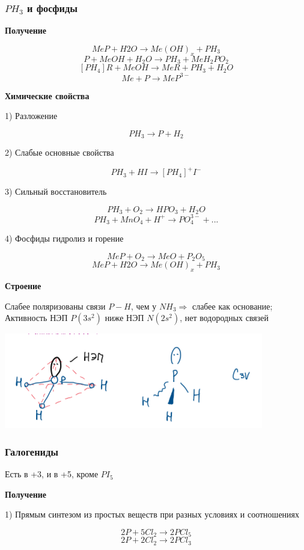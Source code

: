 \documentclass[14pt,a4paper]{scrartcl}
\begin{document}
\subsubsection{$PH_3$ и фосфиды}

\textbf{Получение}

$$MeP + H2O \rightarrow Me(OH)_x + PH_3$$
$$P + MeOH + H_2O \rightarrow PH_3 + MeH_2PO_2$$
$$[PH_4]R + MeOH \rightarrow MeR + PH_3 + H_2O$$
$$Me + P \rightarrow MeP^{3-}$$

\textbf{Химические свойства}

1) Разложение

$$PH_3 \rightarrow P + H_2$$

2) Слабые основные свойства

$$PH_3 + HI \rightarrow [PH_4]^+I^-$$

3) Сильный восстановитель

$$PH_3 + O_2 \rightarrow HPO_3 + H_2O$$
$$PH_3 + MnO_4 + H^+ \rightarrow PO_4^{3-}+...$$

4) Фосфиды  гидролиз  и горение

$$MeP + O_2 \rightarrow MeO + P_2O_5$$
$$MeP + H2O \rightarrow Me(OH)_x + PH_3$$

\textbf{Строение}

Слабее поляризованы связи $P-H$, чем у $NH_3 \Rightarrow$ слабее как основание;\\
Активность НЭП $P (3s^2)$ ниже НЭП $N (2s^2)$, нет водородных связей

\includegraphics{9v2.png}

\subsubsection{Галогениды}

Есть в +3, и в +5, кроме $PI_5$

\textbf{Получение}

1) Прямым синтезом из простых веществ при разных условиях и соотношениях

$$2P + 5Cl_2 \rightarrow 2PCl_5$$
$$2P + 2Cl_2 \rightarrow 2PCl_3$$
\end{document}
